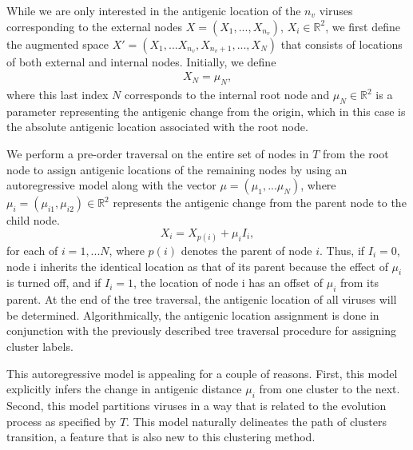 \documentclass[11pt,oneside,letterpaper]{article}
\begin{document}
While we are only interested in the antigenic location of the $n_v$ viruses corresponding to the external nodes $X=(X_1,..., X_{n_{v}})$, $X_i \in \mathbb{R}^{2}$, we first define the augmented space $X' = (X_1, ...X_{n_v}, X_{ n_v +1},..., X_N)$ that consists of locations of both  external and internal nodes.
Initially, we define
\begin{eqnarray}
 	X_{N} = \mu_N     ,
\end{eqnarray}
 where this last index $N$ corresponds to the internal root node and $\mu_N \in \mathbb{R}^{2}$ is a parameter representing the antigenic change from the origin, which in this case is the absolute antigenic location associated with the root node. 

We perform a pre-order traversal on the entire set of nodes in $T$  from the root node to assign antigenic locations of the remaining nodes by using an autoregressive model along with the vector $\mu = (\mu_1,...\mu_N)$, where $\mu_i = (\mu_{i1},  \mu_{i2}) \in \mathbb{R}^{2}$ represents the antigenic change from the parent node to the child node.
\begin{equation}
	X_i=  X_{p(i)} + \mu_i    I_i   		,
\end{equation}
for each of $i=1,... N$, where $p(i)$ denotes the parent of node $i$.
Thus, if $I_i=0$, node i inherits the identical location as that of its parent because the effect of $\mu_i$ is turned off, and if $I_i=1$, the location of node i has an offset of $\mu_i$ from its parent.
At the end of the tree traversal, the antigenic location of all viruses will be determined.
Algorithmically, the antigenic location assignment is done in conjunction with the previously described tree traversal procedure for assigning cluster labels.



This autoregressive model is appealing for a couple of reasons.
First, this model explicitly infers the change in antigenic distance $\mu_i$ from one cluster to the next.
Second, this model partitions viruses in a way that is related to the evolution process as specified by $T$.
This model naturally delineates the path of clusters transition, a feature that is also new to this clustering method.



\end{document}

